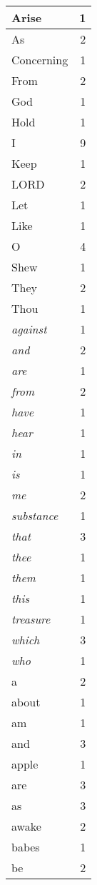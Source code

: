 \begin{center}
\begin{longtable}{l|r}
\hline \hline
\endlastfoot
Arise & 1 \\ \hline
As & 2 \\ \hline
Concerning & 1 \\ \hline
From & 2 \\ \hline
God & 1 \\ \hline
Hold & 1 \\ \hline
I & 9 \\ \hline
Keep & 1 \\ \hline
LORD & 2 \\ \hline
Let & 1 \\ \hline
Like & 1 \\ \hline
O & 4 \\ \hline
Shew & 1 \\ \hline
They & 2 \\ \hline
Thou & 1 \\ \hline
\emph{against} & 1 \\ \hline
\emph{and} & 2 \\ \hline
\emph{are} & 1 \\ \hline
\emph{from} & 2 \\ \hline
\emph{have} & 1 \\ \hline
\emph{hear} & 1 \\ \hline
\emph{in} & 1 \\ \hline
\emph{is} & 1 \\ \hline
\emph{me} & 2 \\ \hline
\emph{substance} & 1 \\ \hline
\emph{that} & 3 \\ \hline
\emph{thee} & 1 \\ \hline
\emph{them} & 1 \\ \hline
\emph{this} & 1 \\ \hline
\emph{treasure} & 1 \\ \hline
\emph{which} & 3 \\ \hline
\emph{who} & 1 \\ \hline
a & 2 \\ \hline
about & 1 \\ \hline
am & 1 \\ \hline
and & 3 \\ \hline
apple & 1 \\ \hline
are & 3 \\ \hline
as & 3 \\ \hline
awake & 2 \\ \hline
babes & 1 \\ \hline
be & 2 \\ \hline

\end{longtable}
\end{center}
